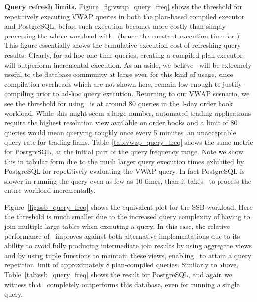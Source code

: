 \textbf{Query refresh limits.}
Figure~\ref{fig:vwap_query_freq} shows the threshold for repetitively executing
VWAP queries in both the plan-based compiled executor and PostgreSQL, before such
execution becomes more costly than simply processing the whole workload with
\compiler\ (hence the constant execution time for \compiler). This figure
essentially shows the cumulative execution cost of refreshing query results.
Clearly, for ad-hoc one-time queries, creating a compiled plan executor will
outperform incremental execution. As an aside, we believe \compiler\ will be
extremely useful to the database community at large even for this kind of usage,
since compilation overheads which are not shown here, remain low enough to
justify compiling prior to ad-hoc query execution. Returning to our VWAP
scenario, we see the threshold for using \compiler\ is at around 80 queries in
the 1-day order book workload. While this might seem a large number, automated
trading applications require the highest resolution view available on order books
and a limit of 80 queries would mean querying roughly once every 5 minutes, an
unacceptable query rate for trading firms. Table~\ref{tab:vwap_query_freq}
shows the same metric for PostgreSQL, at the initial part of the query
frequency range. Note we show this in tabular form due to the much larger query
execution times exhibited by PostgreSQL for repetitively evaluating the VWAP
query. In fact PostgreSQL is slower in running the query even as few as 10
times, than it takes \compiler\ to process the entire workload incrementally.

Figure~\ref{fig:ssb_query_freq} shows the equivalent plot for the SSB workload.
Here the threshold is much smaller due to the increased query complexity of
having to join multiple large tables when executing a query. In this case, the
relative performance of \compiler\ improves against both alternative
implementations due to its ability to avoid fully producing intermediate join
results by using aggregate views and by using tuple functions to maintain these
views, enabling \compiler\ to attain a query repetition limit of approximately 8
plan-compiled queries. Similarly to above, Table~\ref{tab:ssb_query_freq} shows
the result for PostgreSQL, and again we witness that \compiler\ completely
outperforms this database, even for running a single query. 

